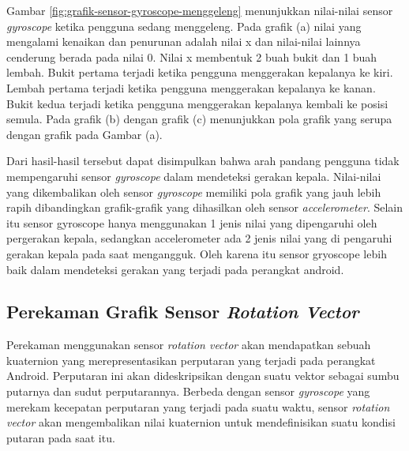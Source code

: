 Gambar \ref{fig:grafik-sensor-gyroscope-menggeleng} menunjukkan nilai-nilai sensor \textit{gyroscope} ketika pengguna sedang menggeleng. Pada grafik (a) nilai yang mengalami kenaikan dan penurunan adalah nilai x dan nilai-nilai lainnya cenderung berada pada nilai 0. Nilai x membentuk 2 buah bukit dan 1 buah lembah. Bukit pertama terjadi ketika pengguna menggerakan kepalanya ke kiri. Lembah pertama terjadi ketika pengguna menggerakan kepalanya ke kanan. Bukit kedua terjadi ketika pengguna menggerakan kepalanya kembali ke posisi semula. Pada grafik (b) dengan grafik (c) menunjukkan pola grafik yang serupa dengan grafik pada Gambar (a).

Dari hasil-hasil tersebut dapat disimpulkan bahwa arah pandang pengguna tidak mempengaruhi sensor \textit{gyroscope} dalam mendeteksi gerakan kepala. Nilai-nilai yang dikembalikan oleh sensor \textit{gyroscope} memiliki  pola grafik yang jauh lebih rapih dibandingkan grafik-grafik yang dihasilkan oleh sensor \textit{accelerometer}. Selain itu sensor gyroscope hanya menggunakan 1 jenis nilai yang dipengaruhi oleh pergerakan kepala, sedangkan accelerometer ada 2 jenis nilai yang di pengaruhi gerakan kepala pada saat mengangguk. Oleh karena itu sensor gryoscope lebih baik dalam mendeteksi gerakan yang terjadi pada perangkat android.

\subsection{Perekaman Grafik Sensor \textit{Rotation Vector}}
\label{sec:analisis_grafik_sensor_rotation_vector}

Perekaman menggunakan sensor \textit{rotation vector} akan mendapatkan sebuah kuaternion yang merepresentasikan perputaran yang terjadi pada perangkat Android. Perputaran ini akan dideskripsikan dengan suatu vektor sebagai sumbu putarnya dan sudut perputarannya. Berbeda dengan sensor \textit{gyroscope} yang merekam kecepatan perputaran yang terjadi pada suatu waktu, sensor \textit{rotation vector} akan mengembalikan nilai kuaternion untuk mendefinisikan suatu kondisi putaran pada saat itu. 

